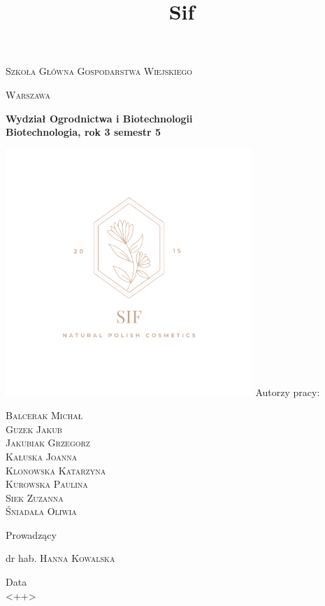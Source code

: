 \documentclass{article}
\title{Sif}
\begin{document}
\begin{titlepage}
	\begin{center}
	{\scshape\huge Szkoła Główna Gospodarstwa Wiejskiego \par}
	\vspace{0.5cm}
	{\scshape\LARGE Warszawa \par}
	\vspace{0.5cm}
	{\LARGE\bfseries Wydział Ogrodnictwa i Biotechnologii \\ Biotechnologia, rok 3 semestr 5 \par}
	{\includegraphics[width=0.7\textwidth]{sif.png}}
	\vfill
	{\Large Autorzy pracy: \\}
	{\large \textsc{Balcerak Michał} \\ \textsc{Guzek Jakub} \\ \textsc{Jakubiak Grzegorz} \\ \textsc{Kałuska Joanna} \\ \textsc{Klonowska Katarzyna} \\ \textsc{Kurowska Paulina} \\ \textsc{Siek Zuzanna} \\ \textsc{Śniadała Oliwia} \par}
	\vspace{0.5cm}
	{\Large Prowadzący \par
	dr hab. \textsc{Hanna Kowalska}}

\vfill

	{\LARGE Data \\ <++> \par}
	\end{center}
\end{titlepage}
\end{document}
